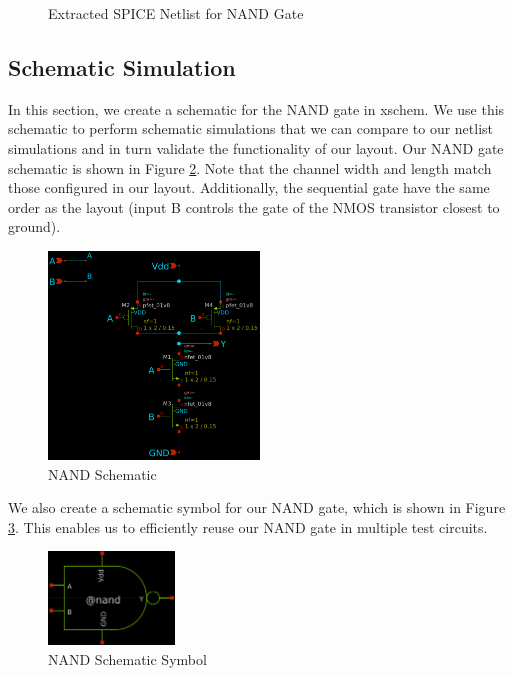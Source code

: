 \documentclass{article}
\begin{document}
	\begin{figure}[H]
		
		\caption{Extracted SPICE Netlist for NAND Gate}
		\label{fig::nand_netlist}
	\end{figure}
	
	\subsection{Schematic Simulation}
	
	In this section, we create a schematic for the NAND gate in xschem. We use this schematic to perform schematic simulations that we can compare to our netlist simulations and in turn validate the functionality of our layout. Our NAND gate schematic is shown in Figure \ref{fig::nand_schematic}. Note that the channel width and length match those configured in our layout. Additionally, the sequential gate have the same order as the layout (input B controls the gate of the NMOS transistor closest to ground).
	
	\begin{figure}[H]
		\centerline{\includegraphics[width=0.5\textwidth]{nand_schematic.png}}
		\caption{NAND Schematic}
		\label{fig::nand_schematic}
	\end{figure}
	
	\noindent We also create a schematic symbol for our NAND gate, which is shown in Figure \ref{fig::nand_symbol}. This enables us to efficiently reuse our NAND gate in multiple test circuits.
	
	\begin{figure}[H]
		\centerline{\includegraphics[width=0.3\textwidth]{nand_symbol.png}}
		\caption{NAND Schematic Symbol}
		\label{fig::nand_symbol}
	\end{figure}
	
\end{document}
